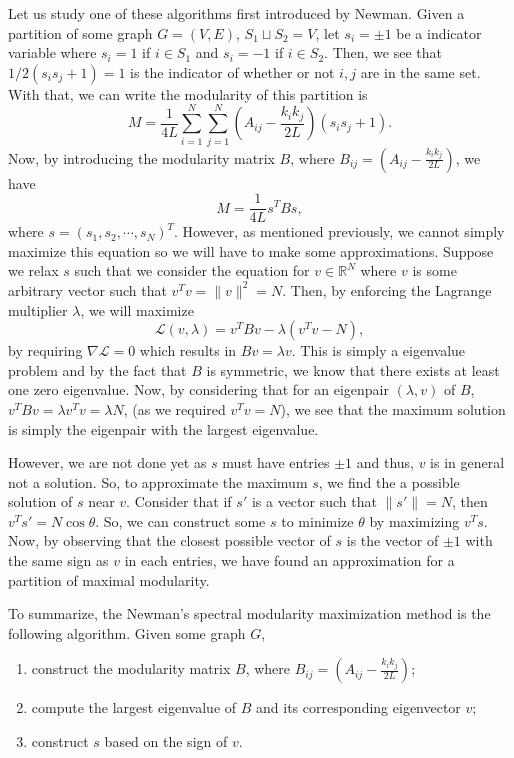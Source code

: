 \documentclass[
]{article}
\theoremstyle{definition}
\theoremstyle{definition}
\begin{document}
Let us study one of these algorithms first introduced by Newman. Given a
partition of some graph \(G = (V, E)\), \(S_1 \sqcup S_2 = V\), let
\(s_i = \pm 1\) be a indicator variable where \(s_i = 1\) if
\(i \in S_1\) and \(s_i = -1\) if \(i \in S_2\). Then, we see that
\(1 / 2 (s_i s_j + 1) = 1\) is the indicator of whether or not \(i, j\)
are in the same set. With that, we can write the modularity of this
partition is
\[M = \frac{1}{4L} \sum_{i = 1}^N \sum_{j = 1}^N \left(A_{ij} - \frac{k_i k_j}{2L}\right) 
  (s_i s_j + 1).\] Now, by introducing the modularity matrix \(B\),
where \(B_{ij} = \left(A_{ij} - \frac{k_i k_j}{2L}\right)\), we have
\[M = \frac{1}{4L}s^T B s,\] where \(s = (s_1, s_2, \cdots, s_N)^T\).
However, as mentioned previously, we cannot simply maximize this
equation so we will have to make some approximations. Suppose we relax
\(s\) such that we consider the equation for \(v \in \mathbb{R}^N\)
where \(v\) is some arbitrary vector such that
\(v^T v = \| v \|^2 = N\). Then, by enforcing the Lagrange multiplier
\(\lambda\), we will maximize
\[\mathcal{L}(v, \lambda) = v^T B v - \lambda(v^T v - N),\] by requiring
\(\nabla \mathcal{L} = 0\) which results in \(Bv = \lambda v\). This is
simply a eigenvalue problem and by the fact that \(B\) is symmetric, we
know that there exists at least one zero eigenvalue. Now, by considering
that for an eigenpair \((\lambda, v)\) of \(B\),
\(v^T B v = \lambda v^T v = \lambda N\), (as we required \(v^T v = N\)),
we see that the maximum solution is simply the eigenpair with the
largest eigenvalue.

However, we are not done yet as \(s\) must have entries \(\pm 1\) and
thus, \(v\) is in general not a solution. So, to approximate the maximum
\(s\), we find the a possible solution of \(s\) near \(v\). Consider
that if \(s'\) is a vector such that \(\| s' \| = N\), then
\(v^T s' = N \cos \theta\). So, we can construct some \(s\) to minimize
\(\theta\) by maximizing \(v^T s\). Now, by observing that the closest
possible vector of \(s\) is the vector of \(\pm 1\) with the same sign
as \(v\) in each entries, we have found an approximation for a partition
of maximal modularity.

To summarize, the Newman's spectral modularity maximization method is
the following algorithm. Given some graph \(G\),

\begin{enumerate}
  \item construct the modularity matrix \(B\), where 
    \(B_{ij} = \left(A_{ij} - \frac{k_i k_j}{2L}\right)\);
  \item compute the largest eigenvalue of \(B\) and its corresponding eigenvector \(v\);
  \item construct \(s\) based on the sign of \(v\).
\end{enumerate}
\end{document}
